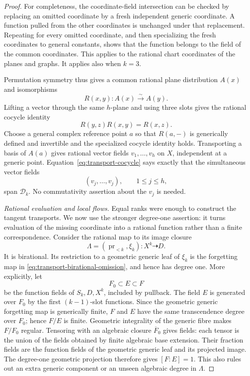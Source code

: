 \begin{proof}
For completeness, the coordinate-field intersection can be checked
by replacing an omitted coordinate by a fresh independent generic
coordinate.  A function pulled from the other coordinates is unchanged
under that replacement.  Repeating for every omitted coordinate, and
then specializing the fresh coordinates to general constants, shows
that the function belongs to the field of the common coordinates.
This applies to the rational chart coordinates of the planes and
graphs.  It applies also when \(k=3\).

Permutation symmetry thus gives a common rational plane distribution
\(A(x)\) and isomorphisms
\[
 R(x,y):A(x)\xrightarrow{\sim}A(y).
\]
Lifting a vector through the same \(h\)-plane and using three slots
gives the rational cocycle identity
\begin{equation}\label{eq:transport-cocycle}
 R(y,z)R(x,y)=R(x,z).
\end{equation}
Choose a general complex reference point \(a\) so that
\(R(a,-)\) is generically defined and invertible and the specialized
cocycle identity holds.  Transporting a basis of \(A(a)\) gives
rational vector fields \(v_1,\ldots,v_h\) on \(X\), independent at
a generic point.  Equation~\eqref{eq:transport-cocycle} says exactly
that the simultaneous vector fields
\[
 (v_j,\ldots,v_j),\qquad 1\le j\le h,
\]
span \(\mathcal D_k\).  No commutativity assertion about the
\(v_j\) is needed.

\medskip\noindent
\emph{Rational evaluation and local flows.}
Equal ranks were enough to construct the tangent transports. We now
use the stronger degree-one assertion: it turns evaluation of the
missing coordinate into a rational function rather than a finite
correspondence.
Consider the rational map to its image closure
\[
 \Lambda=(\operatorname{pr}_{<k},\xi_k):X^k\dashrightarrow D.
\]
It is birational.  Its restriction to a geometric generic leaf of
\(\xi_k\) is the forgetting map in
\eqref{eq:transport-birational-omission}, and hence has degree one.
More explicitly, let
\[
 F_0\subset E\subset F
\]
be the function fields of \(S_k,D,X^k\), included by pullback.
The field \(E\) is generated over \(F_0\) by the first
\((k-1)\)-slot functions. Since the geometric generic forgetting map
is generically finite, \(F\) and \(E\) have the same transcendence
degree over \(F_0\); hence \(F/E\) is finite. Geometric integrality
of the generic fibre makes \(F/F_0\) regular.  Tensoring with an algebraic closure
\(\overline F_0\) gives fields: each tensor is the union of the
fields obtained by finite algebraic base extension.  Their fraction
fields are the function fields of the geometric generic leaf and its
projected image.  The degree-one geometric projection therefore gives
\([F:E]=1\).  This also rules out an extra generic component or an
unseen algebraic degree in \(\Lambda\).


\end{proof}
